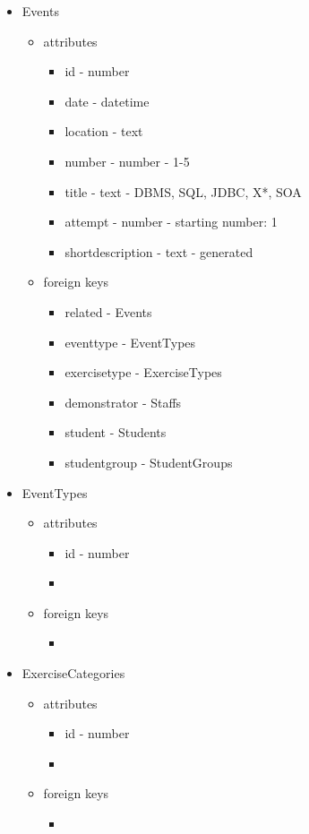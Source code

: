 \begin{itemize}
	\item Events
	\begin{itemize}
		\item attributes
		\begin{itemize}
			\item id - number
			\item date - datetime
			\item location - text
			\item number - number - 1-5
			\item title - text - DBMS, SQL, JDBC, X*, SOA
			\item attempt - number - starting number: 1
			\item shortdescription - text - generated
		\end{itemize}
		\item foreign keys
		\begin{itemize}
			\item related - Events
			\item eventtype - EventTypes
			\item exercisetype - ExerciseTypes
			\item demonstrator - Staffs
			\item student - Students
			\item studentgroup - StudentGroups			
		\end{itemize}
	\end{itemize}
	
	\item EventTypes
	\begin{itemize}
		\item attributes
		\begin{itemize}
			\item id - number
			\item \todo{}
		\end{itemize}
		\item foreign keys
		\begin{itemize}
			\item \todo{}
		\end{itemize}
	\end{itemize}
	
	\item ExerciseCategories
	\begin{itemize}
		\item attributes
		\begin{itemize}
			\item id - number
			\item \todo{}
		\end{itemize}
		\item foreign keys
		\begin{itemize}
			\item \todo{}
		\end{itemize}
	\end{itemize}
	

\end{itemize}
